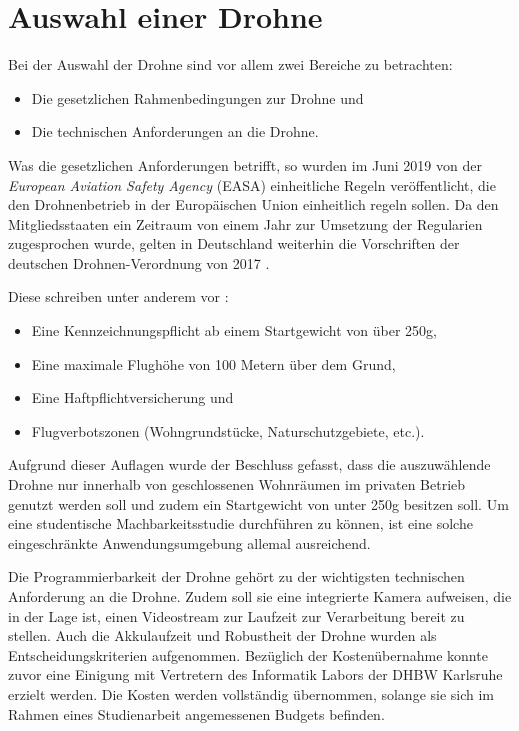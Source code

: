 \section{Auswahl einer Drohne}

Bei der Auswahl der Drohne sind vor allem zwei Bereiche zu betrachten:

\begin{itemize}
	\item Die gesetzlichen Rahmenbedingungen zur Drohne und
	\item Die technischen Anforderungen an die Drohne.
\end{itemize}

Was die gesetzlichen Anforderungen betrifft, so wurden im Juni 2019 von der \textit{European Aviation Safety Agency} (EASA) einheitliche Regeln veröffentlicht, die den Drohnenbetrieb in der Europäischen Union einheitlich regeln sollen. Da den Mitgliedsstaaten ein Zeitraum von einem Jahr zur Umsetzung der Regularien zugesprochen wurde, gelten in Deutschland weiterhin die Vorschriften der deutschen Drohnen-Verordnung von 2017 \cite{EASA.2019}.

Diese schreiben unter anderem vor \cite{Drohnen.de.2020}:
\begin{itemize}
	\item Eine Kennzeichnungspflicht ab einem Startgewicht von über 250g,
	\item Eine maximale Flughöhe von 100 Metern über dem Grund,
	\item Eine Haftpflichtversicherung und
	\item Flugverbotszonen (Wohngrundstücke, Naturschutzgebiete, etc.).
\end{itemize}

Aufgrund dieser Auflagen wurde der Beschluss gefasst, dass die auszuwählende Drohne nur innerhalb von geschlossenen Wohnräumen im privaten Betrieb genutzt werden soll und zudem ein Startgewicht von unter 250g besitzen soll. Um eine studentische Machbarkeitsstudie durchführen zu können, ist eine solche eingeschränkte Anwendungsumgebung allemal ausreichend. 

Die Programmierbarkeit der Drohne gehört zu der wichtigsten technischen Anforderung an die Drohne. Zudem soll sie eine integrierte Kamera aufweisen, die in der Lage ist, einen Videostream zur Laufzeit zur Verarbeitung bereit zu stellen. Auch die Akkulaufzeit und Robustheit der Drohne wurden als Entscheidungskriterien aufgenommen. Bezüglich der Kostenübernahme konnte zuvor eine Einigung mit Vertretern des Informatik Labors der DHBW Karlsruhe erzielt werden. Die Kosten werden vollständig übernommen, solange sie sich im Rahmen eines Studienarbeit angemessenen Budgets befinden.

